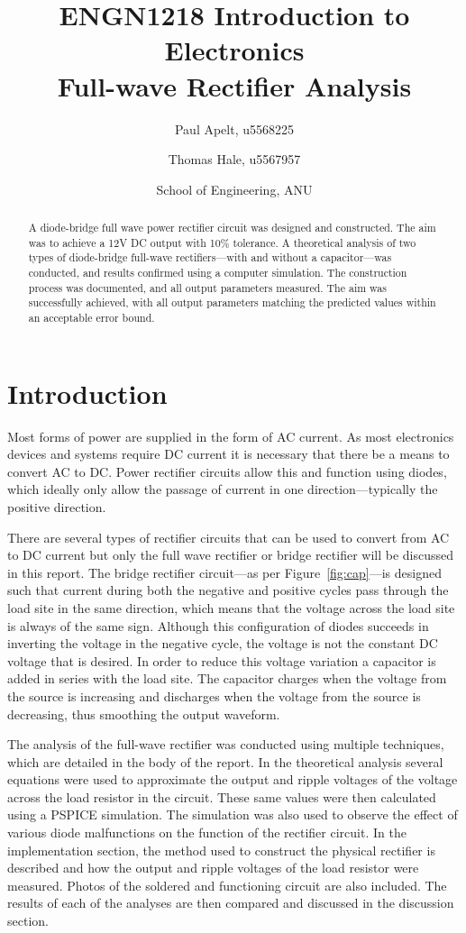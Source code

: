 \documentclass[12pt]{article}
\title{
ENGN1218 Introduction to Electronics\\
Full-wave Rectifier Analysis\\
}
\author{
\and Paul Apelt, u5568225
\and Thomas Hale, u5567957
\and School of Engineering, ANU 
}
\begin{document}
\maketitle

\begin{abstract}
A diode-bridge full wave power rectifier circuit was designed and constructed. The aim was to achieve a 12V DC output with 10\% tolerance. A theoretical analysis of two types of diode-bridge full-wave rectifiers---with and without a capacitor---was conducted, and results confirmed using a computer simulation. The construction process was documented, and all output parameters measured. The aim was successfully achieved, with all output parameters matching the predicted values within an acceptable error bound.
\end{abstract}

\section{Introduction}
\label{sec:int}
Most forms of power are supplied in the form of AC current. As most electronics devices and systems require DC current it is necessary that there be a means to convert AC to DC. Power rectifier circuits allow this and function using diodes, which ideally only allow the passage of current in one direction---typically the positive direction.

There are several types of rectifier circuits that can be used to convert from AC to DC current but only the full wave rectifier or bridge rectifier will be discussed in this report. The bridge rectifier circuit---as per Figure~\ref{fig:cap}---is designed such that current during both the negative and positive cycles pass through the load site in the same direction, which means that the voltage across the load site is always of the same sign. Although this configuration of diodes succeeds in inverting the voltage in the negative cycle, the voltage is not the constant DC voltage that is desired. In order to reduce this voltage variation a capacitor is added in series with the load site. The capacitor charges when the voltage from the source is increasing and discharges when the voltage from the source is decreasing, thus smoothing the output waveform. 

The analysis of the full-wave rectifier was conducted using multiple techniques, which are detailed in the body of the report. In the theoretical analysis several equations were used to approximate the output and ripple voltages of the voltage across the load resistor in the circuit. These same values were then calculated using a PSPICE simulation. The simulation was also used to observe the effect of various diode malfunctions on the function of the rectifier circuit. In the implementation section, the method used to construct the physical rectifier is described and how the output and ripple voltages of the load resistor were measured. Photos of the soldered and functioning circuit are also included. The results of each of the analyses are then compared and discussed in the discussion section.
\end{document}
